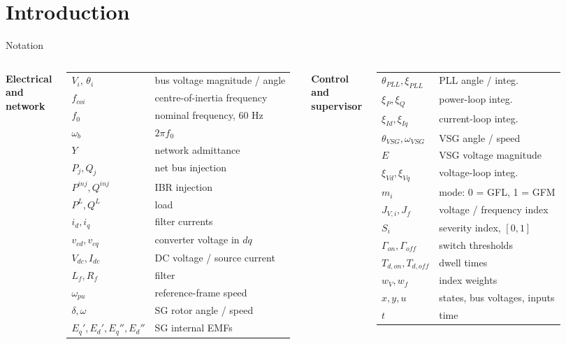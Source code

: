 \documentclass{beamer}
\begin{document}
\section{Introduction}
\begin{frame}{Notation}
\scriptsize
\renewcommand{\arraystretch}{1.22}\setlength{\tabcolsep}{3pt}
\begin{columns}[t,onlytextwidth]
\textbf{Electrical and network}\\[.05cm]
\begin{tabular}{@{}ll@{}}
$V_i$, $\theta_i$ & bus voltage magnitude / angle\\
$f_{coi}$ & centre-of-inertia frequency\\
$f_0$ & nominal frequency, 60 Hz\\
$\omega_b$ & $2\pi f_0$\\
$Y$ & network admittance\\
$P_j,Q_j$ & net bus injection\\
$P^{inj},Q^{inj}$ & IBR injection\\
$P^L,Q^L$ & load\\
$i_d,i_q$ & filter currents\\
$v_{cd},v_{cq}$ & converter voltage in $dq$\\
$V_{dc},I_{dc}$ & DC voltage / source current\\
$L_f,R_f$ & filter\\
$\omega_{pu}$ & reference-frame speed\\
$\delta,\omega$ & SG rotor angle / speed\\
$E_q',E_d',E_q'',E_d''$ & SG internal EMFs\\
\end{tabular}
\textbf{Control and supervisor}\\[.05cm]
\begin{tabular}{@{}ll@{}}
$\theta_{PLL},\xi_{PLL}$ & PLL angle / integ.\\
$\xi_P,\xi_Q$ & power-loop integ.\\
$\xi_{Id},\xi_{Iq}$ & current-loop integ.\\
$\theta_{VSG},\omega_{VSG}$ & VSG angle / speed\\
$E$ & VSG voltage magnitude\\
$\xi_{Vd},\xi_{Vq}$ & voltage-loop integ.\\
$m_i$ & mode: 0 = GFL, 1 = GFM\\
$J_{V,i},J_f$ & voltage / frequency index\\
$S_i$ & severity index, $[0,1]$\\
$\Gamma_{on},\Gamma_{off}$ & switch thresholds\\
$T_{d,on},T_{d,off}$ & dwell times\\
$w_V,w_f$ & index weights\\
$x,y,u$ & states, bus voltages, inputs\\
$t$ & time\\
\end{tabular}
\end{columns}
\end{frame}
\end{document}
